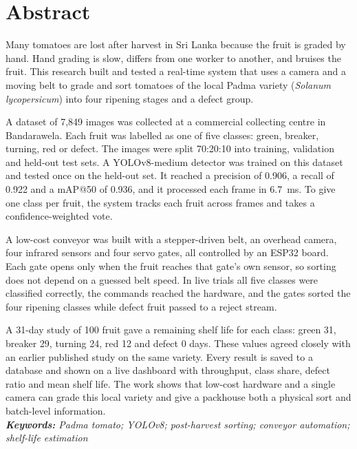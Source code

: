\section*{Abstract}

Many tomatoes are lost after harvest in Sri Lanka because the fruit is graded by hand. Hand grading is slow, differs from one worker to another, and bruises the fruit. This research built and tested a real-time system that uses a camera and a moving belt to grade and sort tomatoes of the local Padma variety (\textit{Solanum lycopersicum}) into four ripening stages and a defect group.

A dataset of 7{,}849 images was collected at a commercial collecting centre in Bandarawela. Each fruit was labelled as one of five classes: green, breaker, turning, red or defect. The images were split 70:20:10 into training, validation and held-out test sets. A YOLOv8-medium detector was trained on this dataset and tested once on the held-out set. It reached a precision of 0.906, a recall of 0.922 and a mAP@50 of 0.936, and it processed each frame in 6.7~ms. To give one class per fruit, the system tracks each fruit across frames and takes a confidence-weighted vote.

A low-cost conveyor was built with a stepper-driven belt, an overhead camera, four infrared sensors and four servo gates, all controlled by an ESP32 board. Each gate opens only when the fruit reaches that gate's own sensor, so sorting does not depend on a guessed belt speed. In live trials all five classes were classified correctly, the commands reached the hardware, and the gates sorted the four ripening classes while defect fruit passed to a reject stream.

A 31-day study of 100 fruit gave a remaining shelf life for each class: green 31, breaker 29, turning 24, red 12 and defect 0 days. These values agreed closely with an earlier published study on the same variety. Every result is saved to a database and shown on a live dashboard with throughput, class share, defect ratio and mean shelf life. The work shows that low-cost hardware and a single camera can grade this local variety and give a packhouse both a physical sort and batch-level information. \\

\noindent \textit{\textbf{Keywords:} Padma tomato; YOLOv8; post-harvest sorting; conveyor automation; shelf-life estimation}

\clearpage
